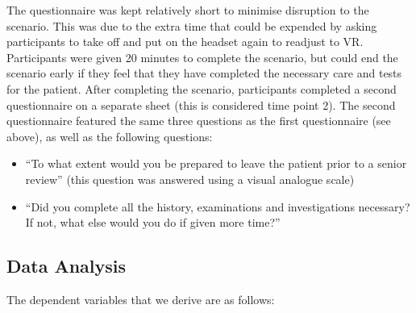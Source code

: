 \documentclass[a4paper, nobind]{templates/ociamthesis}
\providecommand{\tightlist}{%
  \setlength{\itemsep}{0pt}\setlength{\parskip}{0pt}}
\begin{document}
The questionnaire was kept relatively short to minimise disruption to the scenario. This was due to the extra time that could be expended by asking participants to take off and put on the headset again to readjust to VR. Participants were given 20 minutes to complete the scenario, but could end the scenario early if they feel that they have completed the necessary care and tests for the patient. After completing the scenario, participants completed a second questionnaire on a separate sheet (this is considered time point 2). The second questionnaire featured the same three questions as the first questionnaire (see above), as well as the following questions:

\begin{itemize}
\tightlist
\item
  ``To what extent would you be prepared to leave the patient prior to a senior review'' (this question was answered using a visual analogue scale)
\item
  ``Did you complete all the history, examinations and investigations necessary? If not, what else would you do if given more time?''
\end{itemize}

\subsection*{Data Analysis}\label{data-analysis-2}

The dependent variables that we derive are as follows:
\end{document}

